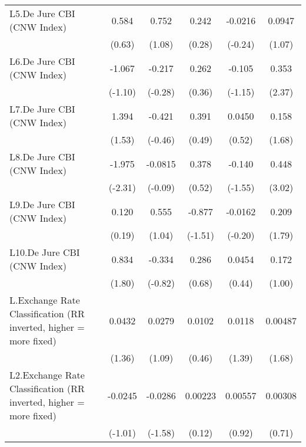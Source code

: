{\begin{longtable}{l*{5}{c}}
\addlinespace
L5.De Jure CBI (CNW Index)&    0.584         &    0.752         &    0.242         &  -0.0216         &   0.0947         \\
                &   (0.63)         &   (1.08)         &   (0.28)         &  (-0.24)         &   (1.07)         \\
\addlinespace
L6.De Jure CBI (CNW Index)&   -1.067         &   -0.217         &    0.262         &   -0.105         &    0.353\sym{*}  \\
                &  (-1.10)         &  (-0.28)         &   (0.36)         &  (-1.15)         &   (2.37)         \\
\addlinespace
L7.De Jure CBI (CNW Index)&    1.394         &   -0.421         &    0.391         &   0.0450         &    0.158         \\
                &   (1.53)         &  (-0.46)         &   (0.49)         &   (0.52)         &   (1.68)         \\
\addlinespace
L8.De Jure CBI (CNW Index)&   -1.975\sym{*}  &  -0.0815         &    0.378         &   -0.140         &    0.448\sym{**} \\
                &  (-2.31)         &  (-0.09)         &   (0.52)         &  (-1.55)         &   (3.02)         \\
\addlinespace
L9.De Jure CBI (CNW Index)&    0.120         &    0.555         &   -0.877         &  -0.0162         &    0.209         \\
                &   (0.19)         &   (1.04)         &  (-1.51)         &  (-0.20)         &   (1.79)         \\
\addlinespace
L10.De Jure CBI (CNW Index)&    0.834         &   -0.334         &    0.286         &   0.0454         &    0.172         \\
                &   (1.80)         &  (-0.82)         &   (0.68)         &   (0.44)         &   (1.00)         \\
\addlinespace
L.Exchange Rate Classification (RR inverted, higher = more fixed)&   0.0432         &   0.0279         &   0.0102         &   0.0118         &  0.00487         \\
                &   (1.36)         &   (1.09)         &   (0.46)         &   (1.39)         &   (1.68)         \\
\addlinespace
L2.Exchange Rate Classification (RR inverted, higher = more fixed)&  -0.0245         &  -0.0286         &  0.00223         &  0.00557         &  0.00308         \\
                &  (-1.01)         &  (-1.58)         &   (0.12)         &   (0.92)         &   (0.71)         \\

\end{longtable}}
